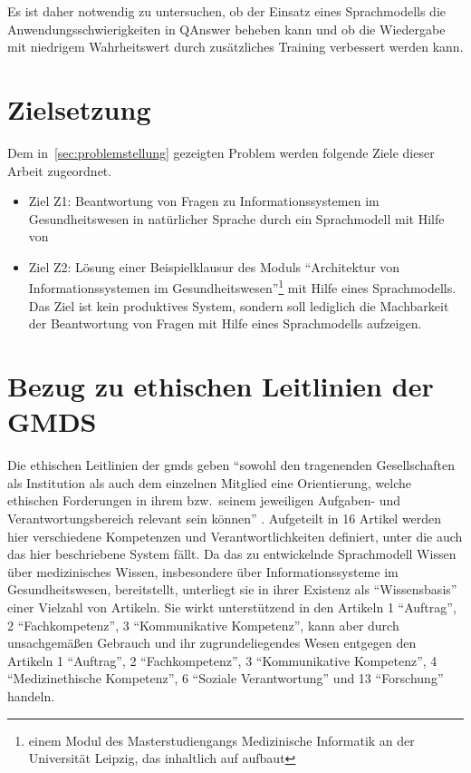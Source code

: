 Es ist daher notwendig zu untersuchen, ob der Einsatz eines Sprachmodells die Anwendungsschwierigkeiten in QAnswer beheben kann und ob die Wiedergabe mit niedrigem Wahrheitswert durch zusätzliches Training verbessert werden kann.

\section{Zielsetzung}\label{sec:zielsetzung}

Dem in~\cref{sec:problemstellung} gezeigten Problem werden folgende Ziele dieser Arbeit zugeordnet.
\begin{itemize}
  \item Ziel Z1: Beantwortung von Fragen zu Informationssystemen im Gesundheitswesen in natürlicher Sprache durch ein Sprachmodell mit Hilfe von \citet{bb}
  \item Ziel Z2: Lösung einer Beispielklausur des Moduls \enquote{Architektur von Informationssystemen im Gesundheitswesen}\footnote{\raggedright{}einem Modul des Masterstudiengangs Medizinische Informatik an der Universität Leipzig, das inhaltlich auf \citet{bb} aufbaut} mit Hilfe eines Sprachmodells.\@
        Das Ziel ist kein produktives System, sondern soll lediglich die Machbarkeit der Beantwortung von Fragen mit Hilfe eines Sprachmodells aufzeigen.
\end{itemize}

\section{Bezug zu ethischen Leitlinien der GMDS}\label{sec:gmds_ethik}

Die ethischen Leitlinien der \ac{gmds} \citep{gmds_eth} geben \enquote{sowohl den tragenenden Gesellschaften als Institution als auch dem einzelnen Mitglied eine Orientierung,
  welche ethischen Forderungen in ihrem bzw.\ seinem jeweiligen Aufgaben- und Verantwortungsbereich relevant sein können} \citep{gmds_eth}.
Aufgeteilt in 16 Artikel werden hier verschiedene Kompetenzen und Verantwortlichkeiten definiert, unter die auch das hier beschriebene System fällt.
Da das zu entwickelnde Sprachmodell Wissen über medizinisches Wissen, insbesondere über Informationssysteme im Gesundheitswesen, bereitstellt,
unterliegt sie in ihrer Existenz als \enquote{Wissensbasis} einer Vielzahl von Artikeln.
Sie wirkt unterstützend in den Artikeln 1 \enquote{Auftrag}, 2 \enquote{Fachkompetenz}, 3 \enquote{Kommunikative Kompetenz},
kann aber durch unsachgemäßen Gebrauch und ihr zugrundeliegendes Wesen entgegen den Artikeln 1 \enquote{Auftrag}, 2 \enquote{Fachkompetenz}, 3 \enquote{Kommunikative Kompetenz},
4 \enquote{Medizinethische Kompetenz}, 6 \enquote{Soziale Verantwortung} und 13 \enquote{Forschung} handeln.\\

